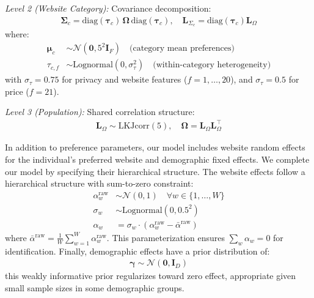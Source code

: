\documentclass[12pt]{article}
\theoremstyle{definition}
\theoremstyle{remark}
\begin{document}
\begin{appendix}
\emph{Level 2 (Website Category):} Covariance decomposition:
\begin{align*}
  \boldsymbol{\Sigma}_c = \text{diag}(\boldsymbol{\tau}_c) \, \boldsymbol{\Omega} \, \text{diag}(\boldsymbol{\tau}_c), \quad \mathbf{L}_{\Sigma_c} = \text{diag}(\boldsymbol{\tau}_c) \mathbf{L}_\Omega
\end{align*}
where:
\begin{align*}
  \boldsymbol{\mu}_c &\sim \mathcal{N}(\mathbf{0}, 5^2 \mathbf{I}_F) \quad \text{(category mean preferences)} \\
  \tau_{c,f} &\sim \text{Lognormal}(0, \sigma_\tau^2) \quad \text{(within-category heterogeneity)}
\end{align*}
with $\sigma_\tau = 0.75$ for privacy and website features ($f = 1, \ldots, 20$), and $\sigma_\tau = 0.5$ for price ($f = 21$).

\emph{Level 3 (Population):} Shared correlation structure:
\begin{align*}
  \mathbf{L}_\Omega \sim \text{LKJcorr}(5), \quad \boldsymbol{\Omega} = \mathbf{L}_\Omega \mathbf{L}_\Omega^\top
\end{align*}

In addition to preference parameters, our model includes website random effects for the individual's preferred website and demographic fixed effects. We complete our model by specifying their hierarchical structure. The website effects follow a hierarchical structure with sum-to-zero constraint:
\begin{align*}
  \alpha_w^{\text{raw}} &\sim \mathcal{N}(0, 1) \quad \forall w \in \{1,\ldots,W\} \\
  \sigma_w &\sim \text{Lognormal}(0, 0.5^2) \\
  \alpha_w &= \sigma_w \cdot \left( \alpha_w^{\text{raw}} - \bar{\alpha}^{\text{raw}} \right)
\end{align*}
where $\bar{\alpha}^{\text{raw}} = \frac{1}{W} \sum_{w=1}^W \alpha_w^{\text{raw}}$. This parameterization ensures $\sum_w \alpha_w = 0$ for identification. Finally, demographic effects have a prior distribution of:
\begin{align*}
  \boldsymbol{\gamma} \sim \mathcal{N}(\mathbf{0}, \mathbf{I}_D)
\end{align*}
this weakly informative prior regularizes toward zero effect, appropriate given small sample sizes in some demographic groups.


\end{appendix}
\end{document}
